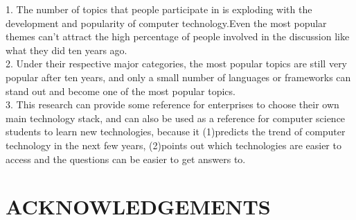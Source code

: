 \documentclass[conference]{IEEEtran}
\begin{document}
1. The number of topics that people participate in is exploding with the development and popularity of computer technology.Even the most popular themes can't attract the high percentage of people involved in the discussion like what they did ten years ago.\\


2. Under their respective major categories, the most popular topics are still very popular after ten years, and only a small number of languages or frameworks can stand out and become one of the most popular topics.\\


3. This research can provide some reference for enterprises to choose their own main technology stack, and can also be used as a reference for computer science students to learn new technologies, because it (1)predicts the trend of computer technology in the next few years, (2)points out which technologies are easier to access and the questions can be easier to get answers to.\\



\section{ACKNOWLEDGEMENTS}




\end{document}
